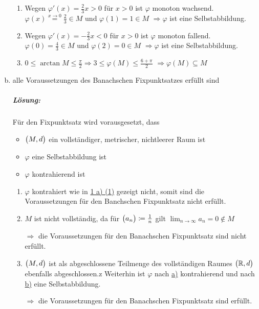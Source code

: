 \documentclass{scrreprt}
\begin{document}
\begin{enumerate}[a)]
\begin{enumerate}[(1)]
  \item Wegen $\varphi'(x) = \frac{2}{3}x > 0$ für $x > 0$ ist $\varphi$ monoton wachsend.
    $\varphi(x) \overset{x \to 0}= \frac{2}{3} \in M$ und $\varphi(1) = 1 \in M$
    $\Rightarrow \varphi$ ist eine Selbstabbildung.

  \label{sec:1_b_3}
  \item Wegen $\varphi'(x) = -\frac{2}{3}x < 0$ für $x > 0$ ist $\varphi$ monoton fallend.
    $\varphi(0) = \frac{4}{3} \in M$ und $\varphi(2) = 0 \in M$
    $\Rightarrow \varphi$ ist eine Selbstabbildung.

  \label{sec:1_b_4}
  \item $0 \leq \arctan M \leq \frac{\pi}{2} \Rightarrow 3 \leq \varphi(M) \leq \frac{6 + \pi}{2}$
    $\Rightarrow \varphi(M) \subseteq M$
  \end{enumerate}

\newpage
\item alle Voraussetzungen des Banachschen Fixpunktsatzes erfüllt sind

  \subparagraph{Lösung:} Für den Fixpunktsatz wird vorausgesetzt, dass
  \begin{itemize}
  \item $\qty\big(M, d)$ ein vollständiger, metrischer, nichtleerer Raum ist
  \item $\varphi$ eine Selbstabbildung ist
  \item $\varphi$ kontrahierend ist
  \end{itemize}
  \begin{enumerate}[(1)]
  \item $\varphi$ kontrahiert wie in \hyperref[sec:1_a_1]{1 a) (1)} gezeigt nicht,
    somit sind die Voraussetzungen für den Banchschen Fixpunktsatz nicht erfüllt.

  \item $M$ ist nicht vollständig, da für $\qty\big(a_n) \coloneqq \frac{1}{n}$
    gilt $\lim_{n \to \infty} a_n = 0 \notin M$

    $\Rightarrow$ die Voraussetzungen für den Banachschen Fixpunktsatz sind nicht erfüllt.

  \item $\qty\big(M, d)$ ist als abgeschlossene Teilmenge des vollständigen Raumes
    $\qty\big(\mathbb{R}, d)$ ebenfalls abgeschlossen.z
    Weiterhin ist $\varphi$ nach \hyperref[sec:1_a_3]{a)} kontrahierend und nach
    \hyperref[sec:1_b_3]{b)} eine Selbstabbildung.

    $\Rightarrow$ die Voraussetzungen für den Banachschen Fixpunktsatz sind erfüllt.


\end{enumerate}
\end{enumerate}
\end{document}
